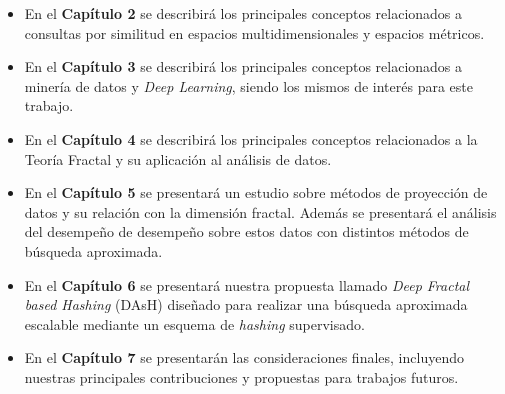 \begin{itemize}
    \item En el \textbf{Capítulo 2} se describirá los principales conceptos relacionados a consultas por similitud en espacios multidimensionales y espacios métricos. 
    \item En el \textbf{Capítulo 3} se describirá los principales conceptos relacionados a minería de datos y \textit{Deep Learning}, siendo los mismos de interés para este trabajo.
    
    \item En el \textbf{Capítulo 4} se describirá los principales conceptos relacionados a la Teoría Fractal y su aplicación   al análisis de datos.
    
    \item En el \textbf{Capítulo 5} se presentará  un estudio sobre métodos de proyección de datos y su relación con la dimensión fractal. Además se presentará el análisis del desempeño  de desempeño sobre estos datos con distintos  métodos de búsqueda aproximada. 


     \item En el \textbf{Capítulo 6} se presentará nuestra propuesta llamado \textit{Deep Fractal based  Hashing} (DAsH) diseñado para realizar una búsqueda aproximada escalable mediante un esquema de \textit{hashing} supervisado.
     
    
    \item En el \textbf{Capítulo 7} se presentarán las consideraciones finales, incluyendo nuestras principales contribuciones y propuestas para trabajos futuros.
    
\end{itemize}

 
